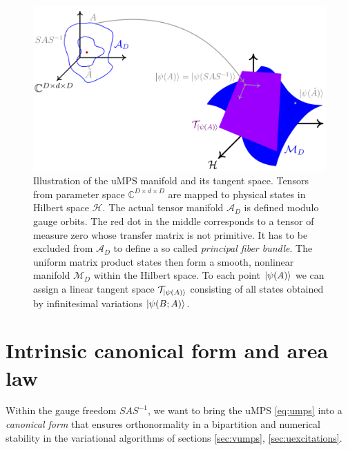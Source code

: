 \begin{figure}[t]
  \centering
  \includegraphics[width=0.75\linewidth]{manifold_tangent_space.png}
  \caption{Illustration of the uMPS manifold and its tangent space. Tensors from parameter space $\mathbb{C}^{D \times d \times D}$ are mapped to physical states in Hilbert space $\mathcal{H}$. The actual tensor manifold $\mathcal{A}_D$ is defined modulo gauge orbits. The red dot in the middle corresponds to a tensor of measure zero whose transfer matrix is not primitive. It has to be excluded from $\mathcal{A}_D$ to define a so called \textit{principal fiber bundle}. The uniform matrix product states then form a smooth, nonlinear manifold $\mathcal{M}_D$ within the Hilbert space. To each point $\ket{\psi (A)}$ we can assign a linear tangent space $\mathcal{T}_{\ket{\psi (A)}}$ consisting of all states obtained by infinitesimal variations $\ket{\psi (B; A)}$. \cite{haegeman2014geometry, haegeman2013post}}
  \label{fig:manifold_tangent_space}
\end{figure}


\section{Intrinsic canonical form and area law} \label{sec:canonical_form_area_law}
Within the gauge freedom $S A S^{-1}$, we want to bring the uMPS \eqref{eq:umps} into a \textit{canonical form} that ensures orthonormality in a bipartition and numerical stability in the variational algorithms of sections \ref{sec:vumps}, \ref{sec:uexcitations}. \\[1em]


